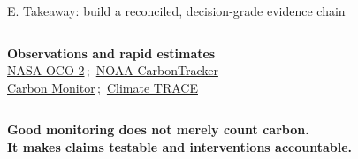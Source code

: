 \documentclass[aspectratio=169,10pt]{beamer}
\begin{document}
\begin{frame}[t,shrink=7]{E. Takeaway: build a reconciled, decision-grade evidence chain}
\begin{columns}[T,onlytextwidth]
{      \textbf{Observations and rapid estimates}\\
      \href{https://ocov2.jpl.nasa.gov/}{NASA OCO-2}\,;\,
      \href{https://gml.noaa.gov/ccgg/carbontracker/}{NOAA CarbonTracker}\\
      \href{https://carbonmonitor.org/}{Carbon Monitor}\,;\,
      \href{https://climatetrace.org/}{Climate TRACE}}
  \end{columns}
  \vfill
  \begin{center}
    {\color{Ink}\large\bfseries Good monitoring does not merely count carbon.}\\
    {\color{Teal}\large\bfseries It makes claims testable and interventions accountable.}
  \end{center}
\end{frame}
\end{document}
